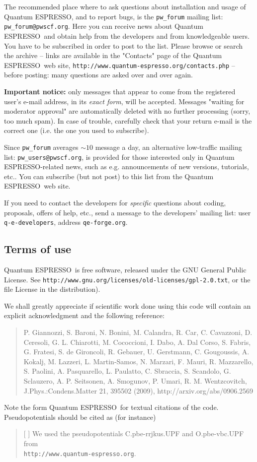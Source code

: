 \documentclass[12pt,a4paper]{article}
\def\qe{{\sc Quantum ESPRESSO}}
\begin{document}
The recommended place where to ask questions about installation 
and usage of \qe, and to report bugs, is the \texttt{pw\_forum} 
mailing list: \texttt{pw\_forum@pwscf.org}. Here you can receive
news about \qe\ and obtain help from the developers and from 
knowledgeable users.  
You have to be subscribed in order to post to the list.
Please browse or search the archive -- links are available
in the "Contacts" page  of the \qe\ web site,
 \texttt{http://www.quantum-espresso.org/contacts.php} -- before 
posting: many questions are asked over and over again.

{\bf Important notice:} only messages that appear to come from the 
registered user's e-mail address, in its {\em exact form}, will be
accepted. Messages "waiting for moderator approval" are
automatically deleted with no further processing (sorry, too 
much spam). In case of trouble, carefully check that your return 
e-mail is the correct one (i.e. the one you used to subscribe).

Since \texttt{pw\_forum} averages $\sim 10$ message a day, an alternative
low-traffic mailing list: \texttt{pw\_users@pwscf.org}, is provided for
those interested only in \qe-related news, such as e.g. announcements 
of new versions, tutorials, etc.. You can subscribe (but not post) to 
this list from the \qe\ web site.

If you need to contact the developers for {\em specific} questions 
about coding, proposals, offers of help, etc., send a message to the
developers' mailing list: user \texttt{q-e-developers}, address
\texttt{qe-forge.org}.
 
\subsection{Terms of use}

\qe\ is free software, released under the 
GNU General Public License. See
\texttt{http://www.gnu.org/licenses/old-licenses/gpl-2.0.txt}, 
or the file License in the distribution).
    
We shall greatly appreciate if scientific work done using this code will 
contain an explicit acknowledgment and the following reference:
\begin{quote}
P. Giannozzi, S. Baroni, N. Bonini, M. Calandra, R. Car, C. Cavazzoni,
D. Ceresoli, G. L. Chiarotti, M. Cococcioni, I. Dabo, A. Dal Corso,
S. Fabris, G. Fratesi, S. de Gironcoli, R. Gebauer, U. Gerstmann,
C. Gougoussis, A. Kokalj, M. Lazzeri, L. Martin-Samos, N. Marzari,
F. Mauri, R. Mazzarello, S. Paolini, A. Pasquarello, L. Paulatto,
C. Sbraccia, S. Scandolo, G. Sclauzero, A. P. Seitsonen, A. Smogunov,
P. Umari, R. M. Wentzcovitch, J.Phys.:Condens.Matter 21, 395502 (2009),
http://arxiv.org/abs/0906.2569
\end{quote}
Note the form \qe\ for textual citations of the code.
Pseudopotentials should be cited as (for instance)
\begin{quote}
[ ] We used the pseudopotentials C.pbe-rrjkus.UPF
and O.pbe-vbc.UPF from\\
\texttt{http://www.quantum-espresso.org}.
\end{quote}
\end{document}
